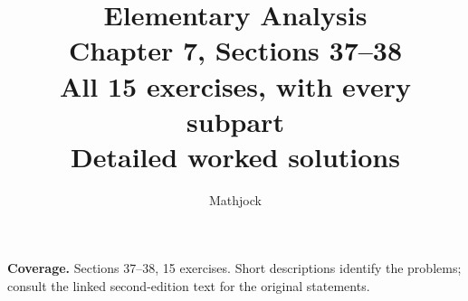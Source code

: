 
\title{\textbf{Elementary Analysis}\\[0.3em]
Chapter 7, Sections 37--38\\[0.4em]
\large All 15 exercises, with every subpart\\
Detailed worked solutions}
\author{Mathjock}
\date{}

\maketitle
\bookinfo
\par\textbf{Coverage.} Sections 37--38, 15 exercises. Short descriptions identify the problems; consult the linked second-edition text for the original statements.
\tableofcontents
\clearpage
\setcounter{section}{36}

\clearpage


